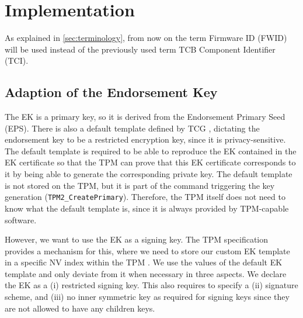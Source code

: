 
\chapter{Implementation}\label{chapter:implementation}

As explained in \autoref{sec:terminology}, from now on the term Firmware ID (FWID) will be used instead of the previously used term TCB Component Identifier (TCI).



\section{Adaption of the Endorsement Key}

The EK is a primary key, so it is derived from the Endorsement Primary Seed (EPS).
There is also a default template defined by TCG \cite{tcg-ek}, dictating the endorsement key to be a restricted encryption key, since it is privacy-sensitive.
The default template is required to be able to reproduce the EK contained in the EK certificate so that the TPM can prove that this EK certificate corresponds to it by being able to generate the corresponding private key.
The default template is not stored on the TPM, but it is part of the command triggering the key generation (\texttt{TPM2\_CreatePrimary}).
Therefore, the TPM itself does not need to know what the default template is, since it is always provided by TPM-capable software.

However, we want to use the EK as a signing key.
The TPM specification provides a mechanism for this, where we need to store our custom EK template in a specific NV index within the TPM \cite{tcg-ek}.
We use the values of the default EK template and only deviate from it when necessary in three aspects.
We declare the EK as a (i) restricted signing key.
This also requires to specify a (ii) signature scheme, and (iii) no inner symmetric key as required for signing keys since they are not allowed to have any children keys.

